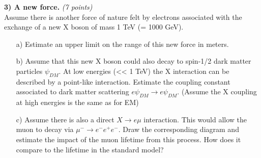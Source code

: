 {\textbf{3) A new force. } \hfill \textit{(7 points)}\\
Assume there is another force of nature felt by electrons associated with the exchange of a new X boson of mass 1 TeV (= 1000 GeV).
\begin{itemize}
\item[a)]{ Estimate an upper limit on the range of this new force in meters.
}
\item[b)]{ Assume that this new X boson could also decay to spin-1/2 dark matter particles $\psi_{DM}$. At low energies (<< 1 TeV) the X interaction can be described by a point-like interaction. Estimate the coupling constant associated to dark matter scattering $e \psi_{DM} \rightarrow e \psi_{DM}$.   (Assume the X coupling at high energies is the same as for EM)  }
\item[c)]{ Assume there is also a direct $X\rightarrow e\mu$ interaction. This would allow the muon to decay via $\mu^- \rightarrow e^-e^+e^-$. Draw the corresponding diagram and estimate the impact of the muon lifetime from this process.  How does it compare to the lifetime in the standard model?     }
\end{itemize}

\clearpage

}

